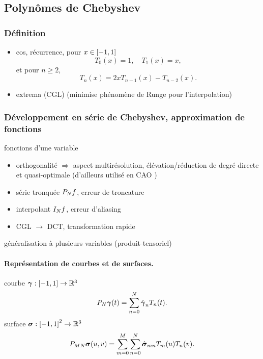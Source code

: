 \subsection{Polynômes de Chebyshev}
\cite{peternell1997}

\subsubsection{Définition}
	\begin{itemize}
		\item cos, récurrence, pour $x \in \chebinterval$ 
		\begin{equation*}
			T_0(x) = 1, \quad T_1(x) = x,
		\end{equation*}				
		et pour $n \geq 2$,
		\begin{equation}
			T_n(x) = 2x T_{n-1}(x) - T_{n-2}(x).
			\label{eq:recurrence_chebyshev}
		\end{equation}
		\item extrema (CGL) (minimise phénomène de Runge pour l'interpolation)
	\end{itemize}
	
\subsubsection{Développement en série de Chebyshev, approximation de fonctions}
fonctions d'une variable
\begin{itemize}
	\item orthogonalité $\Rightarrow$ aspect multirésolution, élévation/réduction de degré directe et quasi-optimale (d'ailleurs utilisé en CAO \cite{lachance1988})
	\item série tronquée $\truncseries{f}{N}$, erreur de troncature
	\item interpolant $\interpolant{f}{N}$, erreur d'aliasing
	\item CGL $\to$ DCT, transformation rapide
\end{itemize}
généralisation à plusieurs variables (produit-tensoriel)

\paragraph{Représentation de courbes et de surfaces.}
courbe $\bg : \chebinterval \to \mathbb{R}^3$
\begin{equation}
	\truncseries{\bg}{N}(t) = \sum_{n=0}^{N} \hat{\bg}_{n} T_n(t).
\end{equation}
surface $\bs : \chebinterval^2 \to \mathbb{R}^3$
\begin{equation}
	\truncseries{\bs}{MN}(u,v) = \sum_{m=0}^{M} \sum_{n=0}^{N} \hat{\bs}_{mn} T_m(u) T_n(v).
\end{equation}

